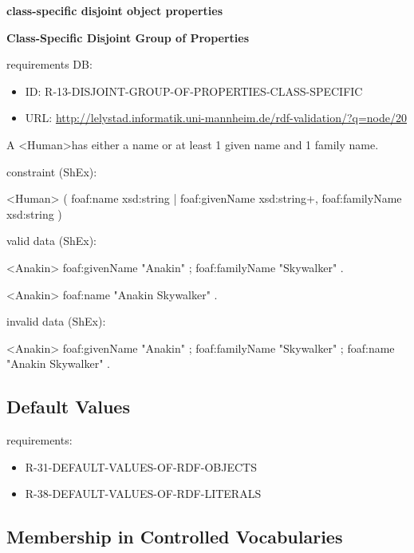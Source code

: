 \documentclass{llncs}
\begin{document}
\textbf{class-specific disjoint object properties}



\textbf{Class-Specific Disjoint Group of Properties}

requirements DB:
\begin{itemize}
  \item ID: R-13-DISJOINT-GROUP-OF-PROPERTIES-CLASS-SPECIFIC
	\item URL: \url{http://lelystad.informatik.uni-mannheim.de/rdf-validation/?q=node/20}
\end{itemize}

A \textless Human\textgreater has either a name or at least 1 given name and 1 family name.

constraint (ShEx):

\begin{ex}
<Human> {                           
    (                                    
            foaf:name xsd:string              
        |                                   
            foaf:givenName xsd:string+,      
            foaf:familyName xsd:string
    )
}
\end{ex}

valid data (ShEx):

\begin{ex}
<Anakin>
    foaf:givenName "Anakin" ;
    foaf:familyName "Skywalker" .
\end{ex}

\begin{ex}
<Anakin>
    foaf:name "Anakin Skywalker" .
\end{ex}

invalid data (ShEx):

\begin{ex}
<Anakin>
    foaf:givenName "Anakin" ;
    foaf:familyName "Skywalker" ;
    foaf:name "Anakin Skywalker" .
\end{ex}

\subsection{Default Values}

requirements:

\begin{itemize}
	\item R-31-DEFAULT-VALUES-OF-RDF-OBJECTS
  \item R-38-DEFAULT-VALUES-OF-RDF-LITERALS
\end{itemize}

\subsection{Membership in Controlled Vocabularies}
\end{document}
